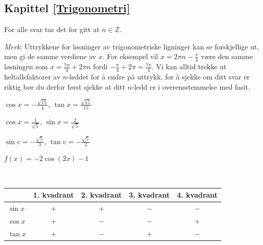 



\usepackage{xr}




\subsection*{Kapittel \ref{Trigonometri}}	
\footnotesize
For alle svar tas det for gitt at $ n\in \mathbb{Z} $.

\textsl{Merk}: Uttrykkene for løsninger av trigonometriske ligninger kan se forskjellige ut, men gi de samme verdiene av $ x $. For eksempel vil $ {x= 2\pi n-\frac{\pi}{4}} $ være den samme løsningen som $ {x = \frac{7\pi}{4}+2\pi n} $ fordi $ {-\frac{\pi}{4}+2\pi = \frac{7\pi}{4}}$. Vi kan alltid trekke ut heltallsfaktorer av $ n $-leddet for å endre på uttrykk, for å sjekke om ditt svar er riktig bør du derfor først sjekke at ditt $ n $-ledd er i overensstemmelse med fasit.





 \selos


$\cos x=-\frac{\sqrt{15}}{4}$, $\tan x=\frac{\sqrt{15}}{15}$

$\cos x = \frac{1}{\sqrt{5}}$, $\sin x=\frac{2}{\sqrt{5}}$

$\sin v =- \frac{\sqrt{5}}{3}$, $\tan v=-\frac{\sqrt{5}}{2}$

$f(x)=-2\cos\left(2x\right)-1$

\\
\begin{tabular}{@{}l|c| c| c|c|}

	&1. kvadrant & 2. kvadrant & 3. kvadrant & 4. kvadrant\\ \hline
	$ \sin x $& +& +& $ - $&$ - $\\ \hline
	$ \cos x $& +& $ - $& $ - $&+\\ \hline
	$ \tan x $& +& $ - $& +&$ - $\\\hline
\end{tabular}\vsk

